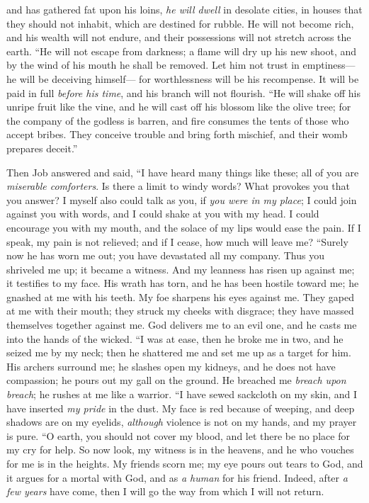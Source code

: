 \begin{biblechapter}
and has gathered fat upon his loins,
\verse \textit{he will dwell} in desolate cities, 
in houses that they should not inhabit, 
which are destined for rubble.
\verse He will not become rich, and his wealth will not endure, 
and their possessions will not stretch across the earth.
\verse “He will not escape from darkness; 
a flame will dry up his new shoot, 
and by the wind of his mouth he shall be removed.
\verse Let him not trust in emptiness—he will be deceiving himself— 
for worthlessness will be his recompense.
\verse It will be paid in full \textit{before his time}, 
and his branch will not flourish.
\verse “He will shake off his unripe fruit like the vine, 
and he will cast off his blossom like the olive tree;
\verse for the company of the godless is barren, 
and fire consumes the tents of those who accept bribes.
\verse They conceive trouble and bring forth mischief, 
and their womb prepares deceit.”
\end{biblechapter}

\begin{biblechapter} %
 Then Job answered and said,
\verse “I have heard many things like these; 
all of you are \textit{miserable comforters}.
\verse Is there a limit to windy words? 
What provokes you that you answer?
\verse I myself also could talk as you, 
if \textit{you were in my place}; 
I could join against you with words, 
and I could shake at you with my head.
\verse I could encourage you with my mouth, 
and the solace of my lips would ease the pain.
\verse If I speak, my pain is not relieved; 
and if I cease, how much will leave me?
\verse “Surely now he has worn me out; 
you have devastated all my company.
\verse Thus you shriveled me up; 
it became a witness. 
And my leanness has risen up against me; 
it testifies to my face.
\verse His wrath has torn, and he has been hostile toward me; 
he gnashed at me with his teeth. 
My foe sharpens his eyes against me.
\verse They gaped at me with their mouth; 
they struck my cheeks with disgrace; 
they have massed themselves together against me.
\verse God delivers me to an evil one, 
and he casts me into the hands of the wicked.
\verse “I was at ease, then he broke me in two, 
and he seized me by my neck; 
then he shattered me 
and set me up as a target for him.
\verse His archers surround me; 
he slashes open my kidneys, and he does not have compassion; 
he pours out my gall on the ground.
\verse He breached me \textit{breach upon breach}; 
he rushes at me like a warrior.
\verse “I have sewed sackcloth on my skin, 
and I have inserted \textit{my pride} in the dust.
\verse My face is red because of weeping, 
and deep shadows are on my eyelids,
\verse \textit{although} violence is not on my hands, 
and my prayer is pure.
\verse “O earth, you should not cover my blood, 
and let there be no place for my cry for help.
\verse So now look, my witness is in the heavens, 
and he who vouches for me is in the heights.
\verse My friends scorn me; 
my eye pours out tears to God,
\verse and it argues for a mortal with God, 
and as \textit{a human} for his friend.
\verse Indeed, after \textit{a few years} have come, 
then I will go the way from which I will not return.
\end{biblechapter}

